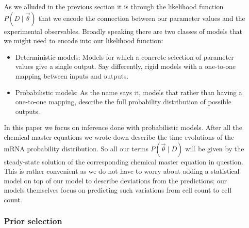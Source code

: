 
As we alluded in the previous section it is through the likelihood function 
$P(D \mid \vec{\theta})$ that we encode the connection between our parameter 
values and the experimental observables. Broadly speaking there are two classes
of models that we might need to encode into our likelihood function:
\begin{itemize}
        \item Deterministic models: Models for which a concrete selection of
        parameter values give a single output. Say differently, rigid models 
        with a one-to-one mapping between inputs and outputs.
        \item Probabilistic models: As the name says it, models that rather than
        having a one-to-one mapping, describe the full probability distribution
        of possible outputs.
\end{itemize}
In this paper we focus on inference done with probabilistic models. After all
the chemical master equations we wrote down describe the time evolutions of the
mRNA probability distribution. So all our terms $P(\vec{\theta} \mid D)$ will be
given by the steady-state solution of the corresponding chemical master equation
in question. This is rather convenient as we do not have to worry about adding a
statistical model on top of our model to describe deviations from the
predictions; our models themselves focus on predicting such variations from cell
count to cell count.

\subsubsection{Prior selection}


